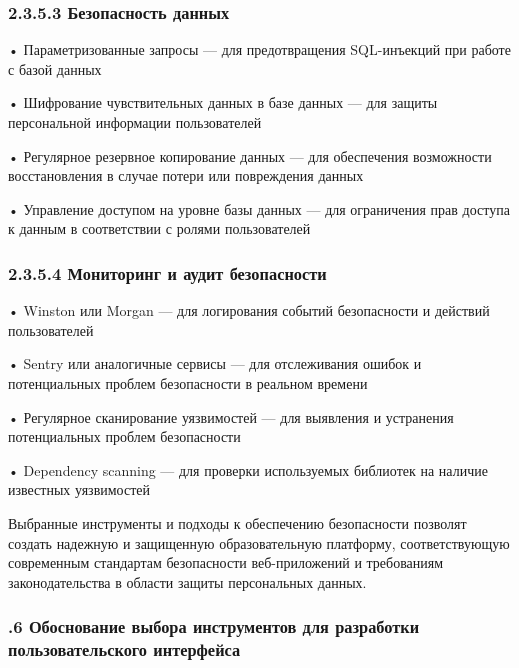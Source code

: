 {  \subsubsection*{2.3.5.3 Безопасность данных}

  \par \redline • Параметризованные запросы — для предотвращения SQL-инъекций при работе с базой данных
  \par \redline • Шифрование чувствительных данных в базе данных — для защиты персональной информации пользователей
  \par \redline • Регулярное резервное копирование данных — для обеспечения возможности восстановления в случае потери или повреждения данных
  \par \redline • Управление доступом на уровне базы данных — для ограничения прав доступа к данным в соответствии с ролями пользователей

  \subsubsection*{2.3.5.4 Мониторинг и аудит безопасности}

  \par \redline • Winston или Morgan — для логирования событий безопасности и действий пользователей
  \par \redline • Sentry или аналогичные сервисы — для отслеживания ошибок и потенциальных проблем безопасности в реальном времени
  \par \redline • Регулярное сканирование уязвимостей — для выявления и устранения потенциальных проблем безопасности
  \par \redline • Dependency scanning — для проверки используемых библиотек на наличие известных уязвимостей

  \par \redline Выбранные инструменты и подходы к обеспечению безопасности позволят создать надежную и защищенную образовательную платформу, соответствующую современным стандартам безопасности веб-приложений и требованиям законодательства в области защиты персональных данных.

  \par
}

\subtitlespace

\subsubsection*{ 
  \gostTitleFont
  .6 Обоснование выбора инструментов для разработки пользовательского интерфейса
} 

